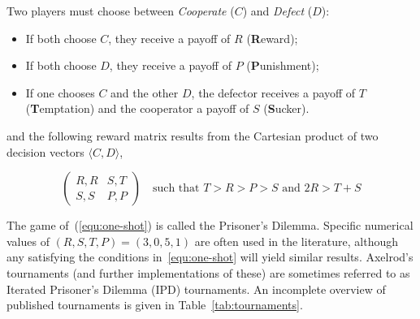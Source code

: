\documentclass{jors}
\begin{document}
Two players must choose between \textit{Cooperate} (\(C\)) and \textit{Defect}
(\(D\)):

\begin{itemize}[noitemsep,topsep=0pt]
    \item If both choose \(C\), they receive a payoff of \(R\)
        (\textbf{R}eward);
    \item If both choose \(D\), they receive a payoff of \(P\)
        (\textbf{P}unishment);
    \item If one chooses \(C\) and the other \(D\), the defector receives a
        payoff of \(T\) (\textbf{T}emptation) and the cooperator a payoff of
        \(S\) (\textbf{S}ucker).
\end{itemize}

and the following reward matrix results from the Cartesian product of
two decision vectors $\langle C, D \rangle$,

\begin{equation}
    \begin{pmatrix}
        R,R & S,T\\
        S,S & P,P
    \end{pmatrix}\quad\text{such that } T>R>P>S \text{ and } 2R > T + S
    \label{equ:one-shot}
\end{equation}

The game of~(\ref{equ:one-shot}) is called the Prisoner's Dilemma. Specific
numerical values of \((R,S,T,P)=(3,0,5,1)\) are often used in the literature,
although any satisfying the conditions in~\ref{equ:one-shot} will yield similar
results.  Axelrod's tournaments (and further implementations of these) are
sometimes referred to as Iterated Prisoner's Dilemma (IPD) tournaments. An
incomplete overview of published tournaments is given in
Table~\ref{tab:tournaments}.
\end{document}
